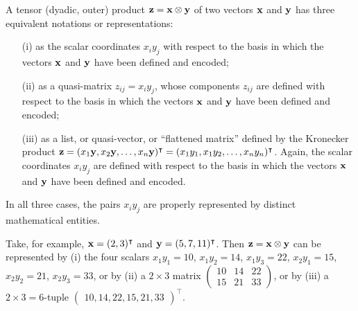 A tensor (dyadic, outer) product ${\bf z} = {\bf x} \otimes {\bf y}$ of two vectors ${\bf x}$ and ${\bf y}$
has three equivalent notations or representations:
\begin{itemize}
\item[(i)]
as the scalar coordinates $x_iy_j$ with respect to the basis in which the vectors ${\bf  x}$ and ${\bf y}$ have been defined and encoded;
\item[(ii)]
as a quasi-matrix $z_{ij}  =x_iy_j$,
whose components $z_{ij}$ are  defined with respect to the basis in which the vectors ${\bf  x}$ and ${\bf y}$
have been defined and encoded;
\item[(iii)]
as a list, or quasi-vector, or ``flattened matrix'' defined by the Kronecker product
${\bf z} = ({ x}_1  {\bf y}, { x}_2  {\bf y}, \ldots , { x}_n  {\bf y})^\intercal =
({ x}_1  { y}_1, { x}_1  { y}_2, \ldots , { x}_n  { y}_n)^\intercal
$. Again, the scalar coordinates $x_iy_j$ are defined
with respect to the basis in which the vectors ${\bf  x}$ and ${\bf y}$ have been defined and encoded.
\end{itemize}
In all three cases, the pairs $x_i y_j$  are properly represented by distinct mathematical entities.

{\color{blue}
\bexample
Take, for example,
${\bf x}=(2,3)^\intercal $
and
${\bf y}=(5,7,11)^\intercal $.
Then ${\bf z} = {\bf x} \otimes {\bf y}$  can be represented by
(i) the four scalars
$x_1y_1=10$,
$x_1y_2=14$,
$x_1y_3=22$,
$x_2y_1=15$,
$x_2y_2=21$,
$x_2y_3=33$,
or by
(ii) a $2 \times 3$ matrix
$
\begin{pmatrix}
10&14&22\\
15&21&33
\end{pmatrix}
$,
or by
(iii) a $2 \times 3 = 6$-tuple
$
\begin{pmatrix}  10,14,22,15,21,33\end{pmatrix} ^\intercal
$.
\eexample
}

